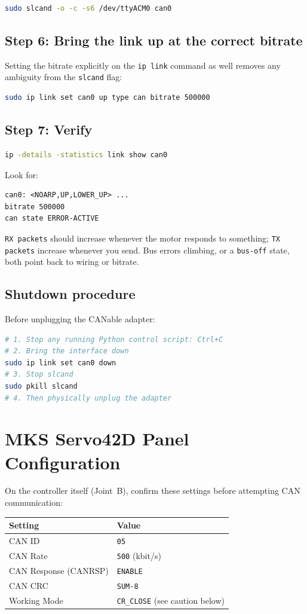 \documentclass[11pt,letterpaper]{article}
\begin{document}
\begin{lstlisting}[language=bash]
sudo slcand -o -c -s6 /dev/ttyACM0 can0
\end{lstlisting}

\subsection{Step 6: Bring the link up at the correct bitrate}
Setting the bitrate explicitly on the \texttt{ip link} command as well removes any ambiguity from the \texttt{slcand} flag:
\begin{lstlisting}[language=bash]
sudo ip link set can0 up type can bitrate 500000
\end{lstlisting}

\subsection{Step 7: Verify}
\begin{lstlisting}[language=bash]
ip -details -statistics link show can0
\end{lstlisting}
Look for:
\begin{lstlisting}
can0: <NOARP,UP,LOWER_UP> ...
bitrate 500000
can state ERROR-ACTIVE
\end{lstlisting}
\texttt{RX packets} should increase whenever the motor responds to something; \texttt{TX packets} increase whenever you send. Bus errors climbing, or a \texttt{bus-off} state, both point back to wiring or bitrate.

\subsection{Shutdown procedure}
Before unplugging the CANable adapter:
\begin{lstlisting}[language=bash]
# 1. Stop any running Python control script: Ctrl+C
# 2. Bring the interface down
sudo ip link set can0 down
# 3. Stop slcand
sudo pkill slcand
# 4. Then physically unplug the adapter
\end{lstlisting}

\newpage
\section{MKS Servo42D Panel Configuration}

On the controller itself (Joint~B), confirm these settings before attempting CAN communication:

\begin{table}[h]
\centering
\begin{tabular}{ll}
\toprule
\textbf{Setting} & \textbf{Value} \\ \midrule
CAN ID & \texttt{05} \\
CAN Rate & \texttt{500} (kbit/s) \\
CAN Response (CANRSP) & \texttt{ENABLE} \\
CAN CRC & \texttt{SUM-8} \\
Working Mode & \texttt{CR\_CLOSE} (see caution below) \\ \bottomrule
\end{tabular}
\end{table}
\end{document}
